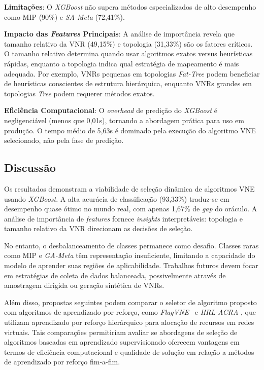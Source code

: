 \documentclass[conference]{IEEEtran}
\begin{document}
\textbf{Limitações}: O \textit{XGBoost} não supera métodos especializados de alto desempenho como MIP (90\%) e \textit{SA-Meta} (72,41\%).

\textbf{Impacto das \textit{Features} Principais}: A análise de importância revela que tamanho relativo da VNR (49,15\%) e topologia (31,33\%) são os fatores críticos.
O tamanho relativo determina quando usar algoritmos exatos versus heurísticas rápidas, enquanto a topologia indica qual estratégia de mapeamento é mais adequada.
Por exemplo, VNRs pequenas em topologias \textit{Fat-Tree} podem beneficiar de heurísticas conscientes de estrutura hierárquica, enquanto VNRs grandes em topologias \textit{Tree} podem requerer métodos exatos.

\textbf{Eficiência Computacional}: O \textit{overhead} de predição do \textit{XGBoost} é negligenciável (menos que 0,01s), tornando a abordagem prática para uso em produção. O tempo médio de 5,63s é dominado pela execução do algoritmo VNE selecionado, não pela fase de predição.

\subsection{Discussão}

Os resultados demonstram a viabilidade de seleção dinâmica de algoritmos VNE usando \textit{XGBoost}. A alta acurácia de classificação (93,33\%) traduz-se em desempenho quase ótimo no mundo real, com apenas 1,67\% de \textit{gap} do oráculo. A análise de importância de \textit{features} fornece \textit{insights} interpretáveis: topologia e tamanho relativo da VNR direcionam as decisões de seleção.

No entanto, o desbalanceamento de classes permanece como desafio. Classes raras como MIP e \textit{GA-Meta} têm representação insuficiente, limitando a capacidade do modelo de aprender suas regiões de aplicabilidade. Trabalhos futuros devem focar em estratégias de coleta de dados balanceada, possivelmente através de amostragem dirigida ou geração sintética de VNRs.

Além disso, propostas seguintes podem comparar o seletor de algoritmo proposto com algoritmos de aprendizado por reforço, como \textit{FlagVNE}~\cite{ijcai-2024-flagvne} e \textit{HRL-ACRA} \cite{tsc-2023-hrl-acra}, que utilizam aprendizado por reforço hierárquico para alocação de recursos em redes virtuais. Tais comparações permitiriam avaliar se abordagens de seleção de algoritmos baseadas em aprendizado supervisionado oferecem vantagens em termos de eficiência computacional e qualidade de solução em relação a métodos de aprendizado por reforço fim-a-fim.
\end{document}
